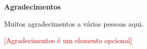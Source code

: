 \thispagestyle{empty}
\Huge
\textbf{Agradecimentos}
\normalsize
\vspace{1cm}

Muitos agradecimentos a várias pessoas aqui.

\textcolor{red}{[Agradecimentos é um elemento opcional]}